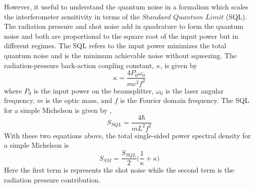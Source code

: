 	However, it useful to understand the quantum noise in a formalism which scales the interferometer sensitivity in terms of the $\textit{Standard Quantum Limit}$ (SQL).   The radiation pressure and shot noise add in quadrature to form the quantum noise and both are proportional to the square root of the input power but in different regimes.  The SQL refers to the input power minimizes the total quantum noise and is the minimum achievable noise without squeezing.  The radiation-pressure back-action coupling constant, $\kappa$, is given by \cite{KimbleConversion}
	\begin{equation}
	\kappa = \frac{4 P_0 \omega_{0}}{m c^2 f^2}
	\end{equation}
	where $P_0$ is the input power on the beamsplitter, $\omega_{0}$ is the laser angular frequency, $m$ is the optic mass, and $f$ is the Fourier domain frequency.  The SQL for a simple Michelson is given by \cite{KimbleConversion},
	\begin{equation}
	S_{SQL} = \frac{4 \hbar}{m L^2 f^2}
	\end{equation}
	With these two equations above, the total single-sided power spectral density for a simple Michelson is
	\begin{equation}
	S_{SM} = \frac{S_{SQL}}{2} \bigg( \frac{1}{\kappa}  + \kappa\bigg)
	\end{equation}
	Here the first term is represents the shot noise while the second term is the radiation pressure contribution. 
